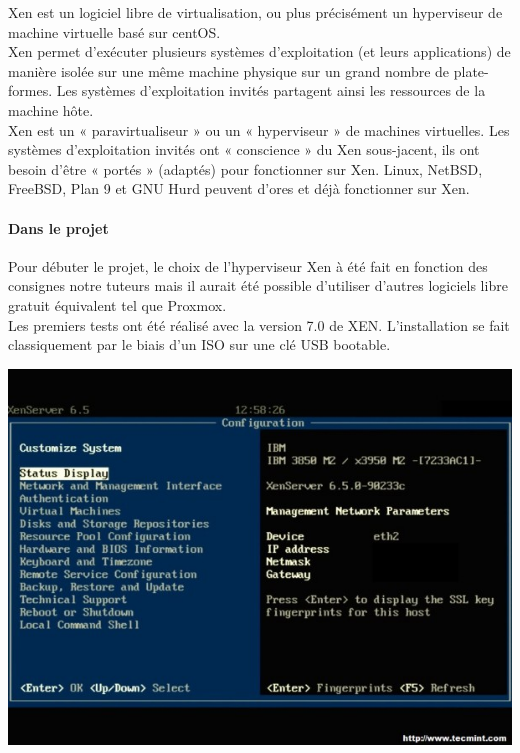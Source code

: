 \documentclass[a4paper,12pt]{article}
\begin{document}
Xen est un logiciel libre de virtualisation, ou plus précisément un hyperviseur de machine virtuelle basé sur centOS.\\

Xen permet d'exécuter plusieurs systèmes d'exploitation (et leurs applications) de manière isolée sur une même machine physique sur un grand nombre de plate-formes. Les systèmes d'exploitation invités partagent ainsi les ressources de la machine hôte.\\

Xen est un « paravirtualiseur » ou un « hyperviseur » de machines virtuelles. Les systèmes d'exploitation invités ont « conscience » du Xen sous-jacent, ils ont besoin d'être « portés » (adaptés) pour fonctionner sur Xen. Linux, NetBSD, FreeBSD, Plan 9 et GNU Hurd peuvent d'ores et déjà fonctionner sur Xen.\\

\paragraph{Dans le projet\\}

Pour débuter le projet, le choix de l’hyperviseur Xen à été fait en fonction des consignes notre tuteurs mais il aurait été possible d’utiliser d’autres logiciels libre gratuit équivalent tel que Proxmox. \\
Les premiers tests ont été réalisé avec la version 7.0 de XEN. L’installation se fait classiquement par le biais d’un ISO sur une clé USB bootable.

\begin{center}
\includegraphics[scale=0.60]{xenserver18}\\
\end{center}
\end{document}
